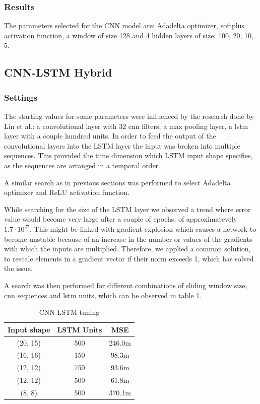 \documentclass[12pt]{article}
\begin{document}
\subsubsection{Results}
The parameters selected for the CNN model are: Adadelta optimizer, softplus activation function, a window of size 128 and 4 hidden layers of size: 100, 20, 10, 5.

\subsection{CNN-LSTM Hybrid}

\subsubsection{Settings}
The starting values for some parameters were influenced by the research done by Lin et al.\cite{cnn_lstm}: a convolutional layer with 32 cnn filters, a max pooling layer, a lstm layer with a couple hundred units. In order to feed the output of the convolutional layers into the LSTM layer the input was broken into multiple sequences. This provided the time dimension which LSTM input shape specifies, as the sequences are arranged in a temporal order.

A similar search as in previous sections was performed to select Adadelta optimizer and ReLU activation function.

While searching for the size of the LSTM layer we observed a trend where error value would become very large after a couple of epochs, of approximatevely $1.7 \cdot 10^{27}$. This might be linked with gradient explosion\cite{mit_dlbook} which causes a network to become unstable because of an increase in the number or values of the gradients with which the inputs are multiplied. Therefore, we applied a common solution, to rescale elements in a gradient vector if their norm exceeds 1, which has solved the issue.

A search was then performed for different combinations of sliding window size, cnn sequences and lstm units, which can be observed in table \ref{tab:cnn_lstm_tune}.

\begin{table}[htbp]
\caption{CNN-LSTM tuning}
\begin{center}
\begin{tabular}{|c|c|c|}
\hline
Input shape & LSTM Units & MSE \\
\hline
(20, 15) & 500 & 246.0m\\
\hline
(16, 16) & 150 & 98.3m\\
\hline
(12, 12) & 750 & 93.6m\\
\hline
(12, 12) & 500 & 61.8m\\
\hline
(8, 8) & 500 & 370.1m\\
\hline
\end{tabular}
\label{tab:cnn_lstm_tune}
\end{center}
\end{table}
\end{document}
